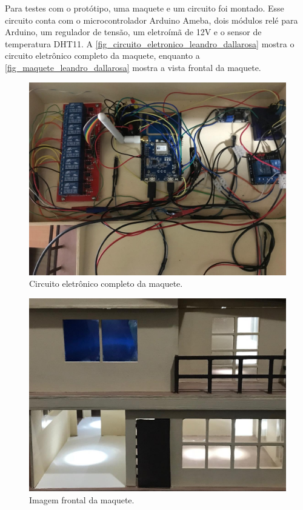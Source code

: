 Para testes com o protótipo, uma maquete e um circuito foi montado. Esse circuito conta com o microcontrolador Arduino Ameba, dois módulos relé para Arduino, um regulador de tensão, um eletroímã de 12V e o sensor de temperatura DHT11. A \autoref{fig_circuito_eletronico_leandro_dallarosa} mostra o circuito eletrônico completo da maquete, enquanto a \autoref{fig_maquete_leandro_dallarosa} mostra a vista frontal da maquete.

\begin{figure}[htb]\label{fig_circuito_eletronico_leandro_dallarosa}
	\caption{Circuito eletrônico completo da maquete.}
	\begin{center}
		\includegraphics[scale=0.4]{Imagens/circuito_eletronico_leandro_dallarosa.png}
	\end{center}
\end{figure}
\begin{figure}[!t]
	\caption{Imagem frontal da maquete.}
	\begin{center}
		\includegraphics[scale=0.4]{Imagens/maquete_leandro_dallarosa.png}
	\end{center}
	\label{fig_maquete_leandro_dallarosa}
\end{figure}

